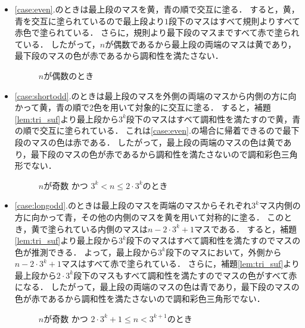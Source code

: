 \begin{itemize}
  \item
    \ref{case:even}.のときは最上段のマスを黄，青の順で交互に塗る．
    すると，黄，青を交互に塗られているので最上段より$1$段下のマスはすべて規則よりすべて赤色で塗られている．
    さらに，規則より最下段のマスまですべて赤で塗られている．
    したがって，$n$が偶数であるから最上段の両端のマスは黄であり，最下段のマスの色が赤であるから調和性を満たさない．
    \begin{figure}[h]
      \centering
      
      \caption{$n$が偶数のとき}
      \label{fig:even_steps}
    \end{figure}
  \item
    \ref{case:shortodd}.のときは最上段のマスを外側の両端のマスから内側の方に向かって黄，青の順で$2$色を用いて対象的に交互に塗る．
    すると，補題\ref{lem:tri_suf}より最上段から$3^k$段下のマスはすべて調和性を満たすので黄，青の順で交互に塗られている．
    これは\ref{case:even}.の場合に帰着できるので最下段のマスの色は赤である．
    したがって，最上段の両端のマスの色は黄であり，最下段のマスの色が赤であるから調和性を満たさないので調和彩色三角形でない．
    \begin{figure}[h]
      \centering
      
      \caption{$n$が奇数 かつ $3^{k} < n \leq 2 \cdot 3^{k}$のとき}
      \label{fig:shortodd_steps}
    \end{figure}
  \item
    \ref{case:longodd}.のときは最上段のマスを両端のマスからそれぞれ$3^k$マス内側の方に向かって青，その他の内側のマスを黄を用いて対称的に塗る．
    このとき，黄で塗られている内側のマスは$n-2\cdot3^k+1$マスである．
    すると，補題\ref{lem:tri_suf}より最上段から$3^k$段下のマスはすべて調和性を満たすのでマスの色が推測できる．
    よって，最上段から$3^k$段下のマスにおいて，外側から$n-2\cdot3^k+1$マスはすべて赤で塗られている．
    さらに，補題\ref{lem:tri_suf}より最上段から$2\cdot3^k$段下のマスもすべて調和性を満たすのでマスの色がすべて赤になる．
    したがって，最上段の両端のマスの色は青であり，最下段のマスの色が赤であるから調和性を満たさないので調和彩色三角形でない．
    \begin{figure}[h]
      \centering
      
      \caption{$n$が奇数 かつ $2 \cdot 3^{k} + 1 \leq n < 3^{k+1}$のとき}
      \label{fig:longodd_steps}
    \end{figure}
\end{itemize}

